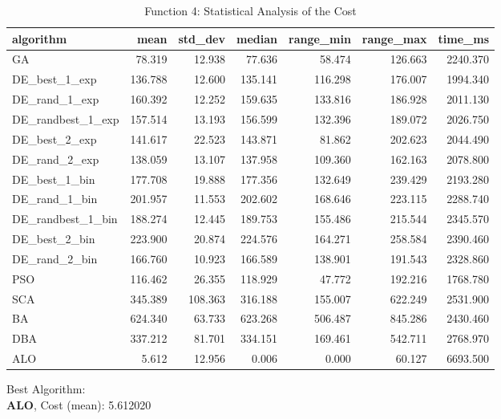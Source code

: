 \documentclass[12pt]{article}
\begin{document}
\begin{table}[H]
    \centering
    \footnotesize
    \begin{adjustbox}{width=1\textwidth}
        \begin{tabular}{lrrrrrr}
            \toprule
            algorithm &    mean &  std\_dev &  median &  range\_min &  range\_max &  time\_ms \\
            \midrule
            GA & 78.319 & 12.938 & 77.636 & 58.474 & 126.663 & 2240.370 \\
            DE\_best\_1\_exp & 136.788 & 12.600 & 135.141 & 116.298 & 176.007 & 1994.340 \\
            DE\_rand\_1\_exp & 160.392 & 12.252 & 159.635 & 133.816 & 186.928 & 2011.130 \\
            DE\_randbest\_1\_exp & 157.514 & 13.193 & 156.599 & 132.396 & 189.072 & 2026.750 \\
            DE\_best\_2\_exp & 141.617 & 22.523 & 143.871 & 81.862 & 202.623 & 2044.490 \\
            DE\_rand\_2\_exp & 138.059 & 13.107 & 137.958 & 109.360 & 162.163 & 2078.800 \\
            DE\_best\_1\_bin & 177.708 & 19.888 & 177.356 & 132.649 & 239.429 & 2193.280 \\
            DE\_rand\_1\_bin & 201.957 & 11.553 & 202.602 & 168.646 & 223.115 & 2288.740 \\
            DE\_randbest\_1\_bin & 188.274 & 12.445 & 189.753 & 155.486 & 215.544 & 2345.570 \\
            DE\_best\_2\_bin & 223.900 & 20.874 & 224.576 & 164.271 & 258.584 & 2390.460 \\
            DE\_rand\_2\_bin & 166.760 & 10.923 & 166.589 & 138.901 & 191.543 & 2328.860 \\
            PSO & 116.462 & 26.355 & 118.929 & 47.772 & 192.216 & 1768.780 \\
            SCA & 345.389 & 108.363 & 316.188 & 155.007 & 622.249 & 2531.900 \\
            BA & 624.340 & 63.733 & 623.268 & 506.487 & 845.286 & 2430.460 \\
            DBA & 337.212 & 81.701 & 334.151 & 169.461 & 542.711 & 2768.970 \\
            ALO & 5.612 & 12.956 & 0.006 & 0.000 & 60.127 & 6693.500 \\
            \bottomrule
        \end{tabular}
        
        
    \end{adjustbox}
    \caption{Function 4: Statistical Analysis of the Cost} 
\end{table}
Best Algorithm: \\
\textbf{ALO}, Cost (mean): 5.612020\\
\newpage
\end{document}
